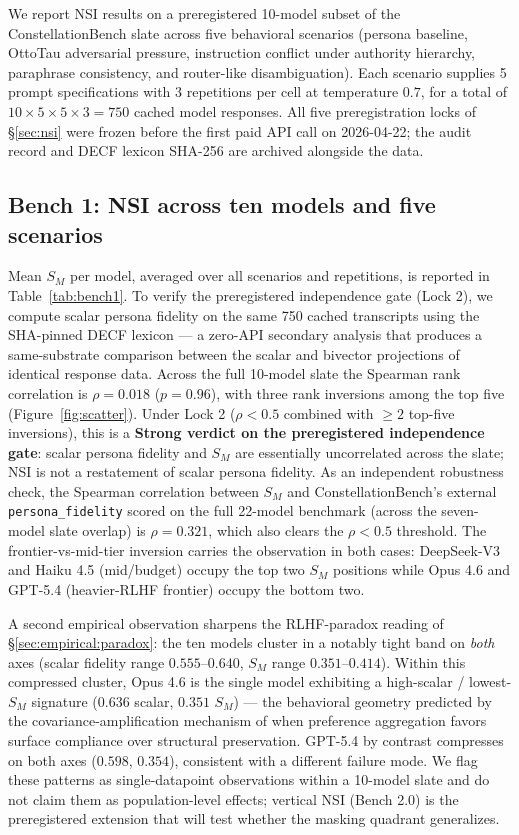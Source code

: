 \documentclass{article}
\begin{document}
We report NSI results on a preregistered 10-model subset of the ConstellationBench slate across five behavioral scenarios (persona baseline, OttoTau adversarial pressure, instruction conflict under authority hierarchy, paraphrase consistency, and router-like disambiguation). Each scenario supplies 5 prompt specifications with 3 repetitions per cell at temperature $0.7$, for a total of $10 \times 5 \times 5 \times 3 = 750$ cached model responses. All five preregistration locks of \S\ref{sec:nsi} were frozen before the first paid API call on 2026-04-22; the audit record and DECF lexicon SHA-256 are archived alongside the data.

\subsection{Bench 1: NSI across ten models and five scenarios}
\label{sec:empirical:bench1}
Mean $S_M$ per model, averaged over all scenarios and repetitions, is reported in Table~\ref{tab:bench1}. To verify the preregistered independence gate (Lock 2), we compute scalar persona fidelity on the same 750 cached transcripts using the SHA-pinned DECF lexicon --- a zero-API secondary analysis that produces a same-substrate comparison between the scalar and bivector projections of identical response data. Across the full 10-model slate the Spearman rank correlation is $\rho = 0.018$ ($p = 0.96$), with three rank inversions among the top five (Figure~\ref{fig:scatter}). Under Lock 2 ($\rho < 0.5$ combined with $\geq 2$ top-five inversions), this is a \textbf{Strong verdict on the preregistered independence gate}: scalar persona fidelity and $S_M$ are essentially uncorrelated across the slate; NSI is not a restatement of scalar persona fidelity. As an independent robustness check, the Spearman correlation between $S_M$ and ConstellationBench's external \texttt{persona\_fidelity} scored on the full 22-model benchmark (across the seven-model slate overlap) is $\rho = 0.321$, which also clears the $\rho < 0.5$ threshold. The frontier-vs-mid-tier inversion carries the observation in both cases: DeepSeek-V3 and Haiku 4.5 (mid/budget) occupy the top two $S_M$ positions while Opus 4.6 and GPT-5.4 (heavier-RLHF frontier) occupy the bottom two.

A second empirical observation sharpens the RLHF-paradox reading of \S\ref{sec:empirical:paradox}: the ten models cluster in a notably tight band on \emph{both} axes (scalar fidelity range $0.555$--$0.640$, $S_M$ range $0.351$--$0.414$). Within this compressed cluster, Opus 4.6 is the single model exhibiting a high-scalar / lowest-$S_M$ signature ($0.636$ scalar, $0.351$ $S_M$) --- the behavioral geometry predicted by the covariance-amplification mechanism of \citet{shapira2026rlhf} when preference aggregation favors surface compliance over structural preservation. GPT-5.4 by contrast compresses on both axes ($0.598$, $0.354$), consistent with a different failure mode. We flag these patterns as single-datapoint observations within a 10-model slate and do not claim them as population-level effects; vertical NSI (Bench 2.0) is the preregistered extension that will test whether the masking quadrant generalizes.
\end{document}
